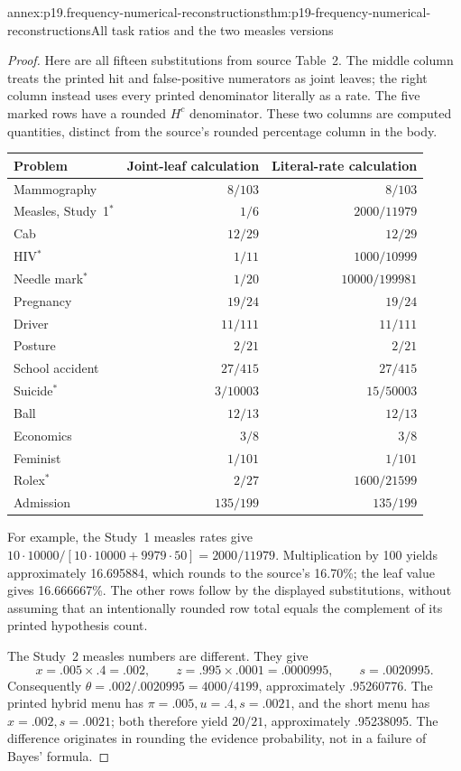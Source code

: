 \begin{annexitem}{annex:p19.frequency-numerical-reconstructions}{thm:p19-frequency-numerical-reconstructions}{All task ratios and the two measles versions}
\begin{proof}
Here are all fifteen substitutions from source Table~2. The middle column
treats the printed hit and false-positive numerators as joint leaves; the
right column instead uses every printed denominator literally as a rate.
The five marked rows have a rounded \(H^c\) denominator. These two columns
are computed quantities, distinct from the source's rounded percentage
column in the body.
\begin{center}\small
\begin{tabular}{lrr}
Problem&Joint-leaf calculation&Literal-rate calculation\\\hline
Mammography&\(8/103\)&\(8/103\)\\
Measles, Study~1\(^{*}\)&\(1/6\)&\(2000/11979\)\\
Cab&\(12/29\)&\(12/29\)\\
HIV\(^{*}\)&\(1/11\)&\(1000/10999\)\\
Needle mark\(^{*}\)&\(1/20\)&\(10000/199981\)\\
Pregnancy&\(19/24\)&\(19/24\)\\
Driver&\(11/111\)&\(11/111\)\\
Posture&\(2/21\)&\(2/21\)\\
School accident&\(27/415\)&\(27/415\)\\
Suicide\(^{*}\)&\(3/10003\)&\(15/50003\)\\
Ball&\(12/13\)&\(12/13\)\\
Economics&\(3/8\)&\(3/8\)\\
Feminist&\(1/101\)&\(1/101\)\\
Rolex\(^{*}\)&\(2/27\)&\(1600/21599\)\\
Admission&\(135/199\)&\(135/199\)
\end{tabular}
\end{center}
For example, the Study~1 measles rates give
\(10\cdot10000/[10\cdot10000+9979\cdot50]=2000/11979\).
Multiplication by 100 yields approximately 16.695884, which rounds to
the source's 16.70\%; the leaf value gives 16.666667\%. The other rows
follow by the displayed substitutions, without assuming that an intentionally
rounded row total equals the complement of its printed hypothesis count.

The Study~2 measles numbers are different. They give
\[
 x=.005\times.4=.002,\qquad
 z=.995\times.0001=.0000995,\qquad s=.0020995.
\]
Consequently \(\theta=.002/.0020995=4000/4199\), approximately
.95260776. The printed hybrid menu has \(\pi=.005,u=.4,s=.0021\),
and the short menu has \(x=.002,s=.0021\); both therefore yield
\(20/21\), approximately .95238095. The difference originates in
rounding the evidence probability, not in a failure of Bayes' formula.


\end{proof}
\end{annexitem}
